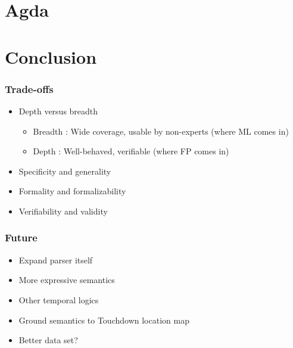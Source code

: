 \documentclass{beamer}
\begin{document}
\section{Agda}

\begin{frame}

\end{frame}

\begin{frame}

\end{frame}

\begin{frame}

\end{frame}

\begin{frame}

\end{frame}

\begin{frame}

\end{frame}

\section{Conclusion}

\begin{frame}
\frametitle{Trade-offs}
\begin{itemize}[<+->]
\item Depth versus breadth
\begin{itemize}[<+->]
\item Breadth : Wide coverage, usable by non-experts (where ML comes in)
\item Depth   : Well-behaved, verifiable (where FP comes in)
\end{itemize}
\item Specificity and generality
\item Formality and formalizability
\item Verifiability and validity
\end{itemize}
\end{frame}

\begin{frame}
\frametitle{Future}
\begin{itemize}[<+->]
\item Expand parser itself
\item More expressive semantics
\item Other temporal logics
\item Ground semantics to Touchdown location map
\item Better data set?
\end{itemize} 
\end{frame}
\end{document}
